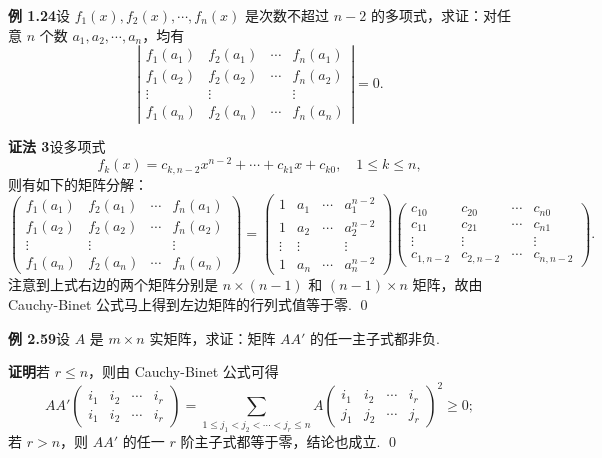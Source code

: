 \documentclass[UTF8, 12pt, fontset=fandol, oneside]{ctexart}
\begin{document}
\noindent\textbf{例 1.24}\quad 设 $f_1(x),f_2(x),\cdots,f_n(x)$ 是次数不超过 $n-2$ 的多项式，求证：对任意 $n$ 个数 $a_1,a_2,\cdots,a_n$，均有
\[
\left|
\begin{array}{cccc}
f_1(a_1) & f_2(a_1) & \cdots & f_n(a_1)\\
f_1(a_2) & f_2(a_2) & \cdots & f_n(a_2)\\
\vdots & \vdots & & \vdots\\
f_1(a_n) & f_2(a_n) & \cdots & f_n(a_n)
\end{array}
\right|=0.
\]

\noindent\textbf{证法 3}\quad 设多项式
\[
f_k(x)=c_{k,n-2}x^{n-2}+\cdots+c_{k1}x+c_{k0},\quad 1\le k\le n,
\]
则有如下的矩阵分解：
\[
\left(
\begin{array}{cccc}
f_1(a_1) & f_2(a_1) & \cdots & f_n(a_1)\\
f_1(a_2) & f_2(a_2) & \cdots & f_n(a_2)\\
\vdots & \vdots & & \vdots\\
f_1(a_n) & f_2(a_n) & \cdots & f_n(a_n)
\end{array}
\right)
=
\left(
\begin{array}{cccc}
1 & a_1 & \cdots & a_1^{n-2}\\
1 & a_2 & \cdots & a_2^{n-2}\\
\vdots & \vdots & & \vdots\\
1 & a_n & \cdots & a_n^{n-2}
\end{array}
\right)
\left(
\begin{array}{cccc}
c_{10} & c_{20} & \cdots & c_{n0}\\
c_{11} & c_{21} & \cdots & c_{n1}\\
\vdots & \vdots & & \vdots\\
c_{1,n-2} & c_{2,n-2} & \cdots & c_{n,n-2}
\end{array}
\right).
\]
注意到上式右边的两个矩阵分别是 $n\times(n-1)$ 和 $(n-1)\times n$ 矩阵，故由 Cauchy-Binet 公式马上得到左边矩阵的行列式值等于零. \qed

\noindent\textbf{例 2.59}\quad 设 $A$ 是 $m\times n$ 实矩阵，求证：矩阵 $AA'$ 的任一主子式都非负.

\noindent\textbf{证明}\quad 若 $r\le n$，则由 Cauchy-Binet 公式可得
\[
AA'\left(
\begin{array}{cccc}
i_1 & i_2 & \cdots & i_r\\
i_1 & i_2 & \cdots & i_r
\end{array}
\right)
=
\sum_{1\le j_1<j_2<\cdots<j_r\le n}
A\left(
\begin{array}{cccc}
i_1 & i_2 & \cdots & i_r\\
j_1 & j_2 & \cdots & j_r
\end{array}
\right)^2
\ge0;
\]
若 $r>n$，则 $AA'$ 的任一 $r$ 阶主子式都等于零，结论也成立. \qed
\end{document}

